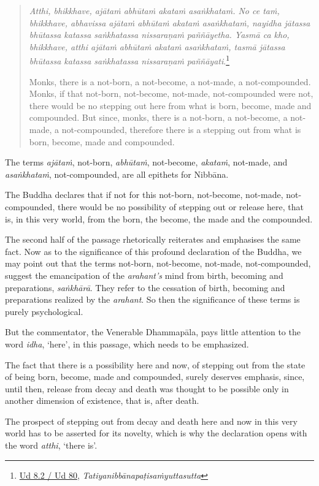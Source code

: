 \begin{quote}
\emph{Atthi, bhikkhave, ajātaṁ abhūtaṁ akataṁ asaṅkhataṁ. No ce taṁ, bhikkhave, abhavissa ajātaṁ abhūtaṁ akataṁ asaṅkhataṁ, nayidha jātassa bhūtassa katassa saṅkhatassa nissaraṇaṁ paññāyetha. Yasmā ca kho, bhikkhave, atthi ajātaṁ abhūtaṁ akataṁ asaṅkhataṁ, tasmā jātassa bhūtassa katassa saṅkhatassa nissaraṇaṁ paññāyati}.\footnote{\href{https://suttacentral.net/ud8.2/pli/ms}{Ud 8.2 / Ud 80}, \emph{Tatiyanibbānapaṭisaṁyuttasutta}}

Monks, there is a not-born, a not-become, a not-made, a not-compounded. Monks, if that not-born, not-become, not-made, not-compounded were not, there would be no stepping out here from what is born, become, made and compounded. But since, monks, there is a not-born, a not-become, a not-made, a not-compounded, therefore there is a stepping out from what is born, become, made and compounded.
\end{quote}

The terms \emph{ajātaṁ}, not-born, \emph{abhūtaṁ}, not-become, \emph{akataṁ}, not-made, and \emph{asaṅkhataṁ}, not-compounded, are all epithets for Nibbāna.

The Buddha declares that if not for this not-born, not-become, not-made, not-compounded, there would be no possibility of stepping out or release here, that is, in this very world, from the born, the become, the made and the compounded.

The second half of the passage rhetorically reiterates and emphasises the same fact. Now as to the significance of this profound declaration of the Buddha, we may point out that the terms not-born, not-become, not-made, not-compounded, suggest the emancipation of the \emph{arahant's} mind from birth, becoming and preparations, \emph{saṅkhārā}. They refer to the cessation of birth, becoming and preparations realized by the \emph{arahant}. So then the significance of these terms is purely psychological.

But the commentator, the Venerable Dhammapāla, pays little attention to the word \emph{idha}, `here', in this passage, which needs to be emphasized.

The fact that there is a possibility here and now, of stepping out from the state of being born, become, made and compounded, surely deserves emphasis, since, until then, release from decay and death was thought to be possible only in another dimension of existence, that is, after death.

The prospect of stepping out from decay and death here and now in this very world has to be asserted for its novelty, which is why the declaration opens with the word \emph{atthi}, `there is'.

